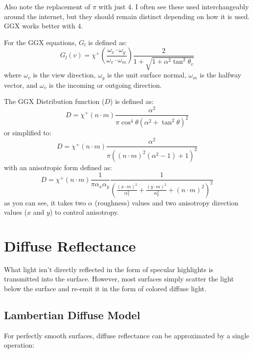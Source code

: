 \documentclass[12pt,letterpaper]{article}
\begin{document}
Also note the replacement of $\pi$ with just $4$. I often see these used interchangeably around the internet, but they should remain distinct depending on how it is used. GGX works better with $4$.

For the GGX equations, $G_l$ is defined as:
$$
G_l(v) = \chi^+ \left(\frac{\omega_v \cdot \omega_g}{\omega_v \cdot \omega_m} \right)
\frac{2}{1 + \sqrt{1 + \alpha^2 \tan^2\theta_v}}
$$
where $\omega_v$ is the view direction, $\omega_g$ is the unit surface normal, $\omega_m$ is the halfway vector, and $\omega_v$ is the incoming or outgoing direction.

The GGX Distribution function ($D$) is defined as:
$$
D = \chi^+\left(n \cdot m\right) \frac{\alpha^2}{\pi \cos^4\theta {\left(  \alpha^2 + \tan^2\theta \right)}^2}
$$
or simplified to:
$$
D = \chi^+\left(n \cdot m\right) \frac{\alpha^2}{\pi {\left( {\left( n \cdot m \right)}^2 \left(\alpha^2 - 1\right) + 1 \right)}^2}
$$
with an anisotropic form defined as:
$$
D = \chi^+\left(n \cdot m\right) \frac{1}{\pi \alpha_x \alpha_y} \frac{1}{{\left(
    \frac{{\left( x \cdot m \right)}^2}{\alpha^{2}_{x}} +
    \frac{{\left( y \cdot m \right)}^2}{\alpha^{2}_{y}} +
    {\left( n \cdot m \right)}^2
\right)}^2}
$$
as you can see, it takes two $\alpha$ (roughness) values and two anisotropy direction values ($x$ and $y$) to control anisotropy.

\newpage

\section{Diffuse Reflectance}

What light isn't directly reflected in the form of specular highlights is transmitted into the surface. However, most surfaces simply scatter the light 
below the surface and re-emit it in the form of colored diffuse light.

\subsection{Lambertian Diffuse Model}

For perfectly smooth surfaces, diffuse reflectance can be approximated by a single operation:
\end{document}
